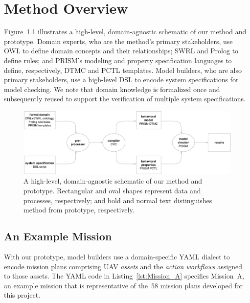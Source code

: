 \chapter{Method Overview}
\label{chap:Method_Overview}

Figure~\ref{fig:method_and_prototype_schematic} illustrates a high-level, domain-agnostic schematic of our method and prototype. Domain experts, who are the method's primary stakeholders, use OWL to define domain concepts and their relationships; SWRL and Prolog to define rules; and PRISM's modeling and property specification languages to define, respectively, DTMC and PCTL templates. Model builders, who are also primary stakeholders, use a high-level DSL to encode system specifications for model checking. We note that domain knowledge is formalized once and subsequently reused to support the verification of multiple system specifications.

\begin{figure}[ht]
\centering
\includegraphics[width=\textwidth]{img/schematic.pdf}
\caption[Method and prototype schematic]{A high-level, domain-agnostic schematic of our method and prototype. Rectangular and oval shapes represent data and processes, respectively; and bold and normal text distinguishes method from prototype, respectively.}
\label{fig:method_and_prototype_schematic}
\end{figure}

\section{An Example Mission}
\label{sec:An_Example_Mission}

With our prototype, model builders use a domain-specific YAML dialect to encode mission plans comprising UAV \emph{assets} and the \emph{action workflows} assigned to those assets. The YAML code in Listing~\ref{lst:Mission_A} specifies Mission~A, an example mission that is representative of the~58 mission plans developed for this project.

